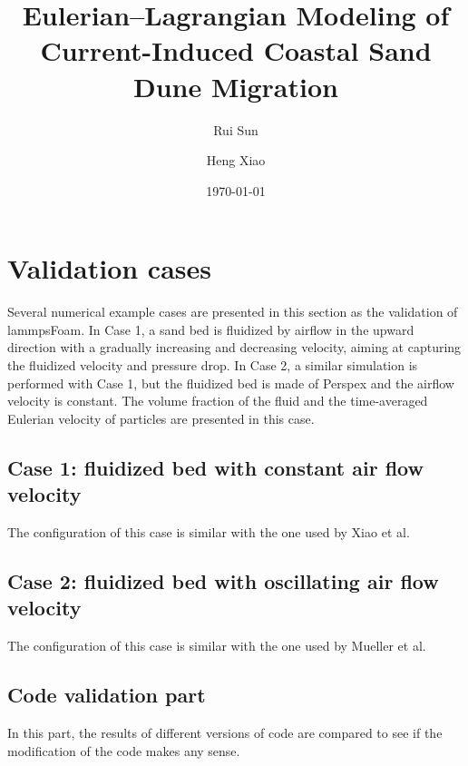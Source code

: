 \documentclass[11pt]{article}
\title{Eulerian--Lagrangian Modeling of Current-Induced Coastal Sand Dune Migration}
\author{Rui Sun \and Heng Xiao}
\date{\today}
\begin{document}
\maketitle

\section{Validation cases}

Several numerical example cases are presented in this section as the validation of lammpsFoam. In
Case 1, a sand bed is fluidized by airflow in the upward direction with a gradually increasing and
decreasing velocity, aiming at capturing the fluidized velocity and pressure drop. In Case 2, a
similar simulation is performed with Case 1, but the fluidized bed is made of Perspex and the
airflow velocity is constant. The volume fraction of the fluid and the time-averaged Eulerian
velocity of particles are presented in this case.

\subsection{Case 1: fluidized bed with constant air flow velocity}

The configuration of this case is similar with the one used by Xiao et
al.~\cite{xiao_algorithms_2011}

\subsection{Case 2: fluidized bed with oscillating air flow velocity}

The configuration of this case is similar with the one used by Mueller et
al.~\cite{muller_validation_2009}

\subsection{Code validation part}

In this part, the results of different versions of code are compared to see if the modification of
the code makes any sense.
\end{document}
